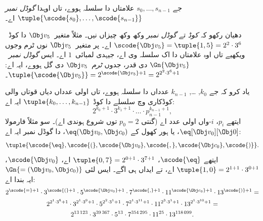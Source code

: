 \documentclass[../../../include/open-logic-section]{subfiles}
\begin{document}
\begin{defn}
جے $s_0, \dots, s_{n-1}$ علامتاں دا سلسلہ
ہووے، تاں اوہدا \emph{گوڈل نمبر}
$\tuple{\scode{s_0}, \dots, \scode{s_{n-1}}}$ اے۔
\end{defn}

\begin{explain}
دھیان رکھو کہ \emph{کوڈ} تے \emph{گوڈل نمبر} وکھ وکھ
چیزاں نیں۔ مثلاً متغیر~$\Obj v_5$ دا کوڈ~$\scode{\Obj
  v_5} = \tuple{1, 5} = 2^2\cdot 3^6$ اے۔ پر متغیر~$\Obj v_5$
نوں ٹرم وجوں ویکھیے تاں اوہ علامتاں دا اک سلسلہ وی اے، جیہدی
لمبائی~$1$ اے۔ ایس \emph{گوڈل نمبر}~$\Gn{\Obj v_5}$ دی قدر،
جدوں \emph{ٹرم}~$\Obj v_5$ دی گل ہووے، ایہ اے:
$\tuple{\scode{\Obj v_5}} = 2^{\scode{\Obj
    v_5} + 1} = 2^{2^2\cdot 3^6 + 1}$۔
\end{explain}

\begin{ex}
یاد کرو کہ جے $k_0$, \dots, $k_{n-1}$
عدداں دا سلسلہ ہووے، تاں اولی عدداں دیاں قوتاں
والی کوڈکاری وچ سلسلے دا کوڈ
$\tuple{k_0, \dots, k_{n-1}}$ ایہ اے:
\[
2^{k_0+1}\cdot3^{k_1+1}\cdot \dots \cdot p_{n-1}^{k_{n-1}+1},
\]
ایتھے $p_i$، $i$-واں اولی عدد اے
(گنتی $p_0 = 2$ توں شروع ہوندی اے)۔
سو مثلاً فارمولا $\eq[\Obj v_0][\Obj 0]$،
یا ہور کھول کے ${\eq}(\Obj v_0,\Obj c_0)$،
دا گوڈل نمبر ایہ اے:
\[
\tuple{\scode{\eq},\scode{(},\scode{\Obj v_0},\scode{,}, \scode{\Obj
    c_0},\scode{)}}.
\]
ایتھے $\scode{\eq}$، $\tuple{0,7} = 2^{0+1}\cdot
3^{7+1}$ اے، $\scode{\Obj v_0}$،
$\tuple{1,0} = 2^{1+1}\cdot3^{0+1}$ اے،
تے ایداں ہی اگے۔ ایس لئی $\Gn{=(\Obj v_0,\Obj c_0)}$
ایہ بندا اے:
\begin{multline*}
2^{\scode{=} + 1}\cdot 3^{\scode{(}+1}\cdot 5^{\scode{\Obj v_0}+1}
\cdot 7^{\scode{,} + 1} \cdot 11^{\scode{\Obj c_0}+1} \cdot
13^{\scode{)}+1} = \\
2^{2^1\cdot 3^8 + 1}\cdot 3^{2^1\cdot 3^9+1}\cdot 5^{2^2\cdot 3^1+1}
\cdot 7^{2^1\cdot 3^{11} + 1} \cdot 11^{2^3\cdot3^1+1} \cdot
13^{2^1\cdot3^{10}+1} = \\
2^{13\,123}\cdot 3^{39\,367}\cdot 5^{13}\cdot 7^{354\,295}\cdot11^{25}\cdot13^{118\,099}.
\end{multline*}
\end{ex}
\end{document}
